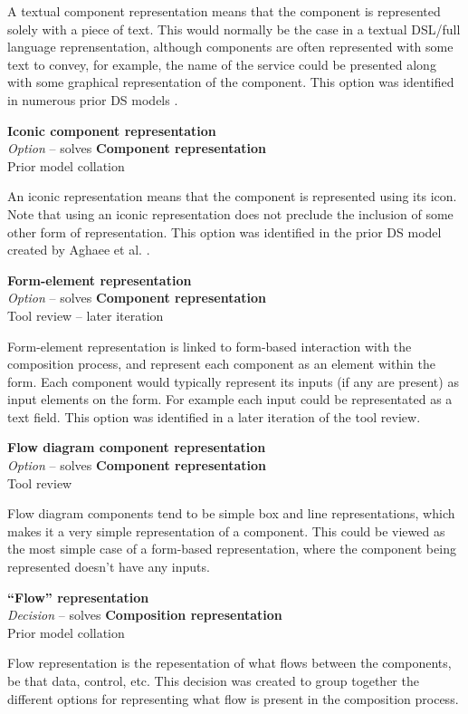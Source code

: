 A textual component representation means that the component is represented solely with a piece of text. This would normally be the case in a textual DSL/full language reprensentation, although components are often represented with some text to convey, for example, the name of the service could be presented along with some graphical representation of the component. This option was identified in numerous prior DS models \cite{Aghaee2012,Fischer2009,Pietschmann2010}.

\textbf{Iconic component representation} \\ \emph{Option} -- solves \textbf{Component representation} \\ Prior model collation \cite{Aghaee2012}

An iconic representation means that the component is represented using its icon. Note that using an iconic representation does not preclude the inclusion of some other form of representation. This option was identified in the prior DS model created by Aghaee et al. \cite{Aghaee2012}.

\textbf{Form-element representation} \\ \emph{Option} -- solves \textbf{Component representation} \\ Tool review  -- later iteration

Form-element representation is linked to form-based interaction with the composition process, and represent each component as an element within the form. Each component would typically represent its inputs (if any are present) as input elements on the form. For example each input could be representated as a text field. This option was identified in a later iteration of the tool review.

\textbf{Flow diagram component representation} \\ \emph{Option} -- solves \textbf{Component representation} \\ Tool review

Flow diagram components tend to be simple box and line representations, which makes it a very simple representation of a component. This could be viewed as the most simple case of a form-based representation, where the component being represented doesn't have any inputs.

\textbf{``Flow'' representation} \\ \emph{Decision} -- solves \textbf{Composition representation} \\ Prior model collation

Flow representation is the repesentation of what flows between the components, be that data, control, etc. This decision was created to group together the different options for representing what flow is present in the composition process.

